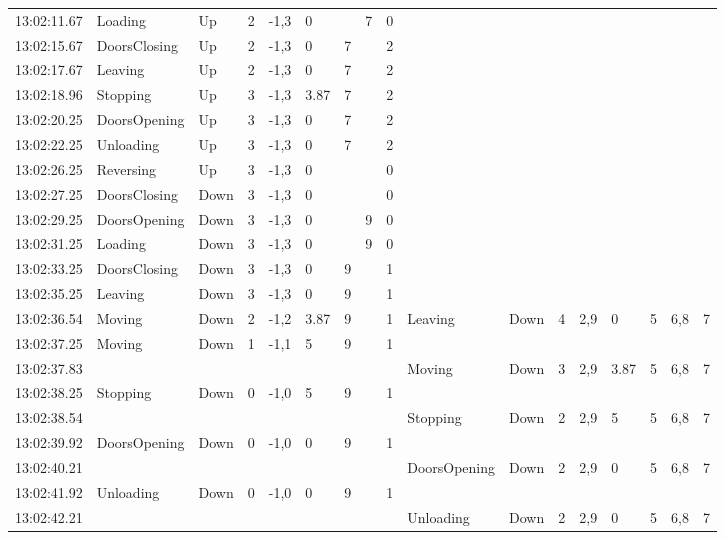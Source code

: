 \documentclass{UoYCSproject}
\begin{document}
\begin{landscape}
\begin{longtable}{l || l | l | l | l | l | l | l | l || l | l | l | l | l | l | l | l}
	13:02:11.67 & Loading & Up & 2 & -1,3 & 0 &  & 7 & 0 &  &  &  &  &  &  &  &  \\
	13:02:15.67 & DoorsClosing & Up & 2 & -1,3 & 0 & 7 &  & 2 &  &  &  &  &  &  &  &  \\
	13:02:17.67 & Leaving & Up & 2 & -1,3 & 0 & 7 &  & 2 &  &  &  &  &  &  &  &  \\
	13:02:18.96 & Stopping & Up & 3 & -1,3 & 3.87 & 7 &  & 2 &  &  &  &  &  &  &  &  \\
	13:02:20.25 & DoorsOpening & Up & 3 & -1,3 & 0 & 7 &  & 2 &  &  &  &  &  &  &  &  \\
	13:02:22.25 & Unloading & Up & 3 & -1,3 & 0 & 7 &  & 2 &  &  &  &  &  &  &  &  \\
	13:02:26.25 & Reversing & Up & 3 & -1,3 & 0 &  &  & 0 &  &  &  &  &  &  &  &  \\
	13:02:27.25 & DoorsClosing & Down & 3 & -1,3 & 0 &  &  & 0 &  &  &  &  &  &  &  &  \\
	13:02:29.25 & DoorsOpening & Down & 3 & -1,3 & 0 &  & 9 & 0 &  &  &  &  &  &  &  &  \\
	13:02:31.25 & Loading & Down & 3 & -1,3 & 0 &  & 9 & 0 &  &  &  &  &  &  &  &  \\
	13:02:33.25 & DoorsClosing & Down & 3 & -1,3 & 0 & 9 &  & 1 &  &  &  &  &  &  &  &  \\
	13:02:35.25 & Leaving & Down & 3 & -1,3 & 0 & 9 &  & 1 &  &  &  &  &  &  &  &  \\
	13:02:36.54 & Moving & Down & 2 & -1,2 & 3.87 & 9 &  & 1 & Leaving & Down & 4 & 2,9 & 0 & 5 & 6,8 & 7 \\
	13:02:37.25 & Moving & Down & 1 & -1,1 & 5 & 9 &  & 1 &  &  &  &  &  &  &  &  \\
	13:02:37.83 &  &  &  &  &  &  &  &  & Moving & Down & 3 & 2,9 & 3.87 & 5 & 6,8 & 7 \\
	13:02:38.25 & Stopping & Down & 0 & -1,0 & 5 & 9 &  & 1 &  &  &  &  &  &  &  &  \\
	13:02:38.54 &  &  &  &  &  &  &  &  & Stopping & Down & 2 & 2,9 & 5 & 5 & 6,8 & 7 \\
	13:02:39.92 & DoorsOpening & Down & 0 & -1,0 & 0 & 9 &  & 1 &  &  &  &  &  &  &  &  \\
	13:02:40.21 &  &  &  &  &  &  &  &  & DoorsOpening & Down & 2 & 2,9 & 0 & 5 & 6,8 & 7 \\
	13:02:41.92 & Unloading & Down & 0 & -1,0 & 0 & 9 &  & 1 &  &  &  &  &  &  &  &  \\
	13:02:42.21 &  &  &  &  &  &  &  &  & Unloading & Down & 2 & 2,9 & 0 & 5 & 6,8 & 7 \\

\end{longtable}
\end{landscape}
\end{document}
